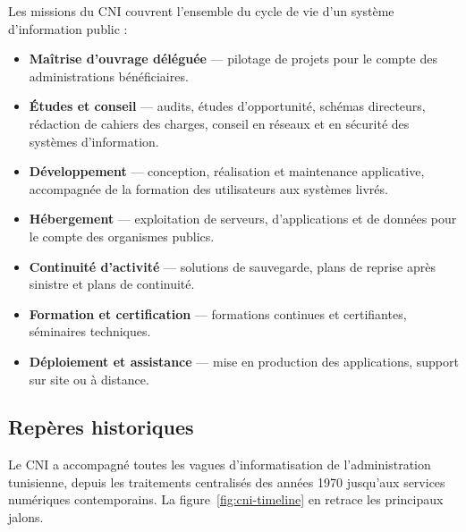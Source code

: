 Les missions du CNI couvrent l'ensemble du cycle de vie d'un système d'information
public :

\begin{itemize}[itemsep=2pt,topsep=4pt]
  \item \textbf{Maîtrise d'ouvrage déléguée} --- pilotage de projets pour le compte
        des administrations bénéficiaires.
  \item \textbf{Études et conseil} --- audits, études d'opportunité, schémas
        directeurs, rédaction de cahiers des charges, conseil en réseaux et en
        sécurité des systèmes d'information.
  \item \textbf{Développement} --- conception, réalisation et maintenance
        applicative, accompagnée de la formation des utilisateurs aux systèmes
        livrés.
  \item \textbf{Hébergement} --- exploitation de serveurs, d'applications et de
        données pour le compte des organismes publics.
  \item \textbf{Continuité d'activité} --- solutions de sauvegarde, plans de reprise
        après sinistre et plans de continuité.
  \item \textbf{Formation et certification} --- formations continues et certifiantes,
        séminaires techniques.
  \item \textbf{Déploiement et assistance} --- mise en production des applications,
        support sur site ou à distance.
\end{itemize}

\subsection{Repères historiques}

Le CNI a accompagné toutes les vagues d'informatisation de l'administration
tunisienne, depuis les traitements centralisés des années 1970 jusqu'aux services
numériques contemporains. La figure~\ref{fig:cni-timeline} en retrace les principaux
jalons.

